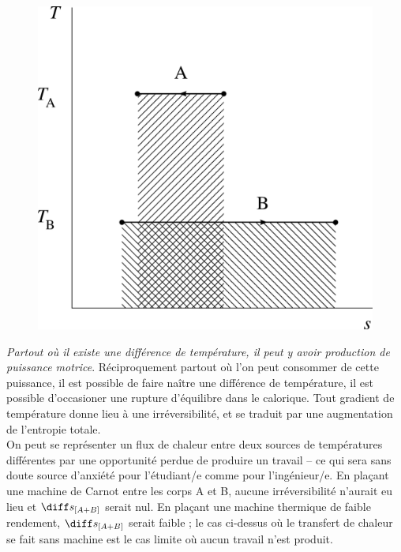 		\begin{figure}
			\begin{center}
				\includegraphics[width=\didacticpvdiagramwidth]{images/ts_echange_chaleur.png}
			\end{center}
			\label{fig_expérience_création_entropie_t-s}
		\end{figure}

		\onlyframabook{\clearfloats}%
			\emph{Partout où il existe une différence de température, il peut y avoir production de puissance motrice}. Réciproquement partout où l’on peut consommer de cette puissance, il est possible de faire naître une différence de température, il est possible d’occasioner une rupture d’équilibre dans le calorique.
		Tout gradient de température donne lieu à une irréversibilité, et se traduit par une augmentation de l’entropie totale. \\
		On peut se représenter un flux de chaleur entre deux sources de températures différentes par une opportunité perdue de produire un travail -- ce qui sera sans doute source d’anxiété pour l’étudiant/e comme pour l’ingénieur/e. En plaçant une machine de Carnot entre les corps A et B, aucune irréversibilité n’aurait eu lieu et $\diff s_{[A+B]}$ serait nul. En plaçant une machine thermique de faible rendement, $\diff s_{[A+B]}$ serait faible ; le cas ci-dessus où le transfert de chaleur se fait sans machine est le cas limite où aucun travail n’est produit.
		

